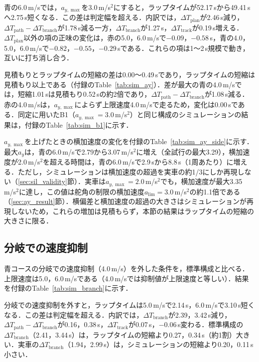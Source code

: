 青の6.0\,m/sでは，$a_{y,\max}$を3.0\,m/s$^2$にすると，ラップタイムが52.17\,sから49.41\,sへ2.75\,s短くなる．この差は判定幅を超える．内訳では，$\Delta T_{\mathrm{plan}}$が2.46\,s減り，$\Delta T_{\mathrm{path}}-\Delta T_{\mathrm{branch}}$が1.78\,s減る一方，$\Delta T_{\mathrm{branch}}$が1.27\,s，$\Delta T_{\mathrm{track}}$が0.19\,s増える．$\Delta T_{\mathrm{plan}}$以外の項の正味の変化は，赤の5.0，6.0\,m/sで$-0.09$，$-0.58$\,s，青の4.0，5.0，6.0\,m/sで$-0.82$，$-0.55$，$-0.29$\,sである．これらの項は1〜2\,s規模で動き，互いに打ち消し合う．

見積もりとラップタイムの短縮の差は0.00〜0.49\,sであり，ラップタイムの短縮は見積もり以上である（付録のTable~\ref{tab:sim_ay}）．差が最大の青の4.0\,m/sでは，短縮1.01\,sは見積もり0.52\,sの約2倍であり，$\Delta T_{\mathrm{path}}-\Delta T_{\mathrm{branch}}$が1.08\,s減る．赤の4.0\,m/sは，$a_{y,\max}$によらず上限速度4.0\,m/sで走るため，変化は0.00\,sである．同定に用いたB1（$a_{y,\max}=3.0$\,m/s$^2$）と同じ構成のシミュレーションの結果は，付録のTable~\ref{tab:sim_b1}に示す．

$a_{y,\max}$を上げたときの横加速度の変化を付録のTable~\ref{tab:sim_ay_side}に示す．最大$a_y$は，青の6.0\,m/sで2.79から3.07\,m/s$^2$に増え（全試行の最大3.29），横加速度が2.0\,m/s$^2$を超える時間は，青の6.0\,m/sで2.9\,sから8.8\,s（1周あたり）に増える．ただし，シミュレーションは横加速度の超過を実車の約1/3にしか再現しない（\ref{sec:sil_validity}節）．実車は$a_{y,\max}=2.0$\,m/s$^2$でも，横加速度が最大3.35\,m/s$^2$に達し，この値は舵角の制限の横加速度$a_{\mathrm{lim}}=3.0$\,m/s$^2$の約1.1倍である（\ref{sec:ay_result}節）．横偏差と横加速度の超過の大きさはシミュレーションが再現しないため，これらの増加は見積もらず，本節の結果はラップタイムの短縮の大きさに限る．

\subsection{分岐での速度抑制}
\label{sec:sil_branch}
青コースの分岐での速度抑制（4.0\,m/s）を外した条件を，標準構成と比べる．上限速度は5.0，6.0\,m/sである（4.0\,m/sでは抑制値が上限速度と等しい）．結果を付録のTable~\ref{tab:sim_branch}に示す．

分岐での速度抑制を外すと，ラップタイムは5.0\,m/sで2.14\,s，6.0\,m/sで3.10\,s短くなる．この差は判定幅を超える．内訳では，$\Delta T_{\mathrm{branch}}$が2.39，3.42\,s減り，$\Delta T_{\mathrm{path}}-\Delta T_{\mathrm{branch}}$が0.16，0.38\,s，$\Delta T_{\mathrm{track}}$が0.07\,s，$-0.06$\,s変わる．標準構成の$\Delta T_{\mathrm{branch}}$（2.41，3.44\,s）は，ラップタイムの短縮より0.27，0.34\,s（約1割）大きい．実車の$\Delta T_{\mathrm{branch}}$（1.94，2.99\,s）は，シミュレーションの短縮より0.20，0.11\,s小さい．

